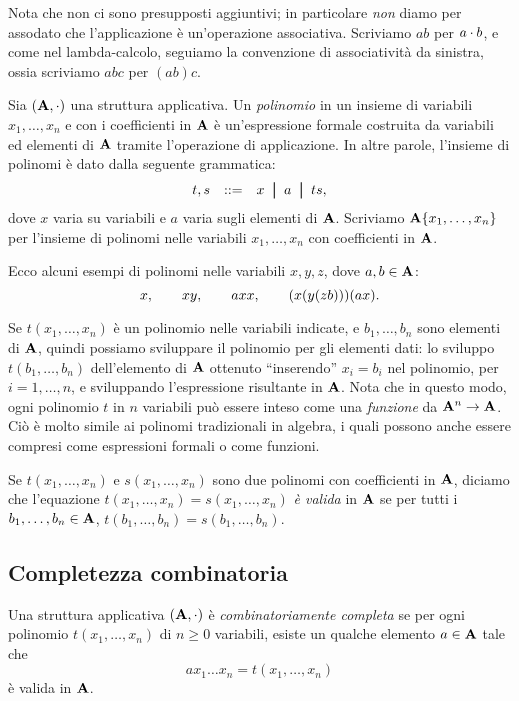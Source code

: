 \documentclass{article}
\begin{document}
Nota che non ci sono presupposti aggiuntivi; in particolare {\em non}
diamo per assodato che l'applicazione \`e un'operazione associativa.
Scriviamo $ab$ per $a\cdot b$, e come nel lambda-calcolo, seguiamo la
convenzione di associativit\`a da sinistra, ossia scriviamo $abc$ per $(ab)c$.

\begin{definition}
  Sia $({\bf A},\cdot)$ una struttura applicativa. Un {\em polinomio} in
  un insieme di variabili $x_1,\ldots,x_n$ e con i coefficienti in ${\bf A}$
  \`e un'espressione formale costruita da variabili ed elementi di ${\bf A}$
  tramite l'operazione di applicazione. In altre parole, l'insieme di
  polinomi \`e dato dalla seguente grammatica:
  \[ \begin{array}{lll}
    t,s&\bnf& x\bor a\bor ts,
  \end{array}
  \]
  dove $x$ varia su variabili e $a$ varia sugli elementi di
  ${\bf A}$. Scriviamo ${\bf A}\{x_1,\ldots,x_n\}$ per l'insieme di polinomi
  nelle variabili $x_1,\ldots,x_n$ con coefficienti in ${\bf A}$.
\end{definition}

Ecco alcuni esempi di polinomi nelle variabili $x,y,z$,
dove $a,b\in{\bf A}$:
\[ x,\hspace{2em} xy, \hspace{2em} axx, \hspace{2em} (x(y(zb)))(ax).
\]

Se $t(x_1,\ldots,x_n)$ \`e un polinomio nelle variabili indicate,
e $b_1,\ldots,b_n$ sono elementi di ${\bf A}$, quindi possiamo sviluppare il
polinomio per gli elementi dati: lo sviluppo $t(b_1,\ldots,b_n)$
dell'elemento di ${\bf A}$ ottenuto ``inserendo'' $x_i=b_i$ nel
polinomio, per $i=1,\ldots,n$, e sviluppando l'espressione
risultante in ${\bf A}$. Nota che in questo modo, ogni polinomio $t$ in
$n$ variabili pu\`o essere inteso come una {\em funzione} da ${\bf A}^n\to
{\bf A}$. Ci\`o \`e molto simile ai polinomi tradizionali in algebra, i quali
possono anche essere compresi come espressioni formali o come
funzioni.

Se $t(x_1,\ldots,x_n)$ e $s(x_1,\ldots,x_n)$ sono due polinomi
con coefficienti in ${\bf A}$, diciamo che l'equazione
$t(x_1,\ldots,x_n) = s(x_1,\ldots,x_n)$ {\em \`e valida} in ${\bf A}$ se per
tutti i $b_1,\ldots,b_n\in{\bf A}$, $t(b_1,\ldots,b_n) = s(b_1,\ldots,b_n)$.

\subsection{Completezza combinatoria}

\begin{definition}
  Una struttura applicativa $({\bf A},\cdot)$ \`e {\em combinatoriamente
    completa} se per ogni polinomio $t(x_1,\ldots,x_n)$ di $n\geq 0$
  variabili, esiste un qualche elemento $a\in{\bf A}$ tale che
  \[ ax_1\ldots x_n = t(x_1,\ldots,x_n)
  \]
  \`e valida in ${\bf A}$.
\end{definition}
\end{document}
